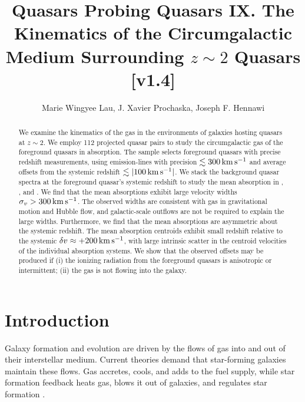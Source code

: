 \documentclass[iop]{emulateapj}
\begin{document}
\title{Quasars Probing Quasars IX. The Kinematics of the Circumgalactic Medium Surrounding 
$z\sim2$ Quasars [v1.4]}

\author{Marie Wingyee Lau, J. Xavier Prochaska, 
Joseph F. Hennawi
}

\begin{abstract}
We examine the kinematics of the gas in the environments of galaxies hosting quasars at $z\sim2$. 
We employ 112 projected quasar pairs to study the circumgalactic gas of the foreground quasars in 
absorption. The sample selects foreground quasars with precise redshift measurements, using 
emission-lines with precision $\lesssim300\,{\rm km\,s^{-1}}$ and average offsets from the 
systemic redshift $\lesssim|100\,{\rm km\,s^{-1}}|$. We stack the background quasar spectra at the 
foreground quasar's systemic redshift to study the mean absorption in , , 
and . We find that the mean absorptions exhibit large velocity widths 
$\sigma_v>300\,{\rm km\,s^{-1}}$. The observed widths are consistent with gas in gravitational 
motion and Hubble flow, and galactic-scale outflows are not be required to explain the large 
widths. Furthermore, we find that the mean absorptions are asymmetric about the systemic redshift. 
The mean absorption centroids exhibit small redshift relative to the 
systemic $\delta v\approx+200\,{\rm km\,s^{-1}}$, with large intrinsic scatter in the centroid 
velocities of the individual absorption systems. We show that the observed offsets may be produced 
if (i) the ionizing radiation from the foreground quasars is anisotropic or intermittent; (ii) the 
gas is not flowing into the galaxy.  
\end{abstract}



\section{Introduction}
\label{sec:introduction}

Galaxy formation and evolution are driven by the flows of gas into and out of their interstellar 
medium. Current theories demand that star-forming galaxies maintain these flows. Gas accretes, 
cools, and adds to the fuel supply, while star formation feedback heats gas, blows it out of 
galaxies, and regulates star formation \citep[for a review see][]{SomervilleDave15}. 
\end{document}

